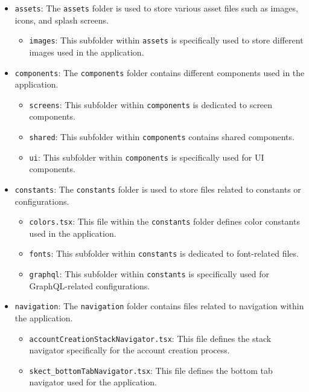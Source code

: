 \begin{itemize}
  \item \texttt{assets}: The \texttt{assets} folder is used to store various asset files such as images, icons, and splash screens.
    \begin{itemize}
      \item \texttt{images}: This subfolder within \texttt{assets} is specifically used to store different images used in the application.
    \end{itemize}
  \item \texttt{components}: The \texttt{components} folder contains different components used in the application.
    \begin{itemize}
      \item \texttt{screens}: This subfolder within \texttt{components} is dedicated to screen components.
      \item \texttt{shared}: This subfolder within \texttt{components} contains shared components.
      \item \texttt{ui}: This subfolder within \texttt{components} is specifically used for UI components.
    \end{itemize}
  \item \texttt{constants}: The \texttt{constants} folder is used to store files related to constants or configurations.
    \begin{itemize}
      \item \texttt{colors.tsx}: This file within the \texttt{constants} folder defines color constants used in the application.
      \item \texttt{fonts}: This subfolder within \texttt{constants} is dedicated to font-related files.
      \item \texttt{graphql}: This subfolder within \texttt{constants} is specifically used for GraphQL-related configurations.
    \end{itemize}
  \item \texttt{navigation}: The \texttt{navigation} folder contains files related to navigation within the application.
    \begin{itemize}
      \item \texttt{accountCreationStackNavigator.tsx}: This file defines the stack navigator specifically for the account creation process.
      \item \texttt{skect\_bottomTabNavigator.tsx}: This file defines the bottom tab navigator used for the application.
    \end{itemize}

\end{itemize}
